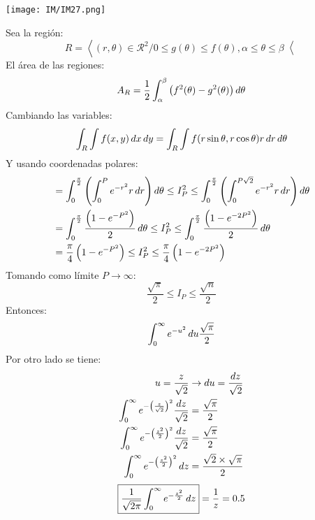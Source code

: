 \documentclass[
	12pt, %
	fleqn, %
	a4paper, %
	oneside, %
]{LegrandOrangeBook}
\begin{document}
\begin{theorem}[Demostrar $\int_0^{\infty}e^{-u^2}\diff u=\frac{\sqrt{\pi}}{2}$]
\begin{center}
\texttt{[image: IM/IM27.png]}
\end{center}
Sea la región:
\begin{displaymath}
R=\left\langle(r,\theta)\in\mathcal{R}^2/0\leq g(\theta)\leq f(\theta),\alpha\leq\theta\leq\beta \right\langle
\end{displaymath}
El área de las regiones:
\begin{displaymath}
A_R=\frac{1}{2}\int_{\alpha}^{\beta}\left(f^2(\theta)-g^2(\theta)\right)\mathop{}\!d\theta
\end{displaymath}
Cambiando las variables:
\begin{displaymath}
\int_R\int f(x,y)\mathop{}\!d x\mathop{}\!d y=\int_R\int f(r\sin\theta,r\cos\theta)r\mathop{}\!d r\mathop{}\!d\theta
\end{displaymath}
Y usando coordenadas polares:
\begin{align*}
&=\int_0^{\frac{\pi}{2}}\left(\int_0^Pe^{-r^2}r\mathop{}\!d r\right)\mathop{}\!d\theta\leq I_P^2\leq \int_0^{\frac{\pi}{2}}\left(\int_0^{P\sqrt{2}}e^{-r^2}r\mathop{}\!d r\right)\mathop{}\!d\theta\\
&=\int_0^{\frac{\pi}{2}}\frac{\left(1-e^{-P^2}\right)}{2}\mathop{}\!d\theta\leq I_P^2\leq \int_0^{\frac{\pi}{2}}\frac{\left(1-e^{-2P^2}\right)}{2}\mathop{}\!d\theta\\
&=\frac{\pi}{4}\left(1-e^{-P^2}\right)\leq I_P^2\leq\frac{\pi}{4}\left(1-e^{-2P^2}\right)
\end{align*}
Tomando como límite $P\to\infty$:
\begin{displaymath}
\frac{\sqrt{\pi}}{2}\leq I_P\leq\frac{\sqrt{n}}{2}
\end{displaymath}
Entonces:
\begin{displaymath}
\int_0^{\infty}e^{-u^2}\mathop{}\!d u\frac{\sqrt{\pi}}{2}
\end{displaymath}
Por otro lado se tiene:
\begin{align*}
u=\frac{z}{\sqrt{2}}&\rightarrow\mathop{}\!d u=\frac{\mathop{}\!d z}{\sqrt{2}}\\
\int_0^{\infty}e^{-\left(\frac{z}{\sqrt{2}}\right)^2}\frac{\mathop{}\!d z}{\sqrt{2}}&=\frac{\sqrt{\pi}}{2}\\
\int_0^{\infty}e^{-\left(\frac{z^2}{2}\right)^2}\frac{\mathop{}\!d z}{\sqrt{2}}&=\frac{\sqrt{\pi}}{2}\\
\int_0^{\infty}e^{-\left(\frac{z^2}{2}\right)^2}\mathop{}\!d z&=\frac{\sqrt{2}\times\sqrt{\pi}}{2}
\end{align*}
\begin{equation*}
\boxed{\frac{1}{\sqrt{2\pi}}\int_0^{\infty}e^{-\frac{z^2}{2}}\mathop{}\!d z}=\frac{1}{z}=0.5
\end{equation*}

\end{theorem}
\end{document}
